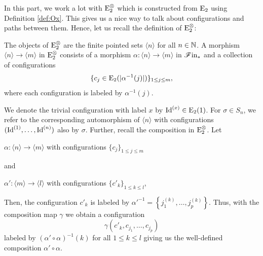 In this part,
we work a lot with $\operatorname{\operatorname{E}_2^{\otimes}}$ which is constructed from $\operatorname{E}_2$ using Definition \ref{def:Ox}. This gives us a nice way to talk about configurations and paths between
them. Hence, let us recall the definition of $\operatorname{\operatorname{E}_2^{\otimes}}$:
\begin{rem}\label{rem:ex}
    The objects of $\operatorname{\operatorname{E}_2^{\otimes}}$ are the finite pointed sets $\langle n \rangle$ for all
    $n \in \mathbb{N}$. A morphism $\langle n \rangle \to \langle m \rangle$ in $\operatorname{\operatorname{E}_2^{\otimes}}$
    consists of a morphism $\alpha \colon \langle n \rangle \to \langle m
    \rangle$ in $\mathscr{F} \text{in}_{\ast}$ and a collection of configurations
    $$\{c_j \in \operatorname{E}_2(|\alpha^{-1}(j)|)\}_{1 \leq j \leq m},$$ where each
    configuration is labeled by $\alpha^{-1}(j)$.

    We denote the trivial configuration with label $x$ by $\operatorname{Id}^{(x)} \in \operatorname{E}_2(1)$.
    For $\sigma \in S_n$, we refer to the corresponding automorphism of $\langle
    n \rangle$ with configurations $(\operatorname{Id}^{(1)}, \dots, \operatorname{Id}^{(n)})$ also by $\sigma$.
    Further, recall the composition in $\operatorname{\operatorname{E}_2^{\otimes}}$. Let 
    \begin{center}
        $\alpha \colon \langle n \rangle \to \langle m \rangle$ with
        configurations $\{c_j\}_{1 \leq j \leq m}$ 
    \end{center}
    and 
    \begin{center}
        $\alpha' \colon \langle m \rangle \to \langle l \rangle$ with
        configurations $\{c'_k\}_{1 \leq k \leq l}$,
    \end{center}
    Then, the configuration $c'_k$ is labeled by $\alpha'^{-1}=\left\{j_1^{(k)},
    \dots, j_p^{(k)}\right\}$. Thus, with the composition map $\gamma$ we obtain a configuration 
    \[
        \gamma(c'_k, c_{j_1}, \dots, c_{j_p})
    \]
    labeled by $(\alpha' \circ \alpha)^{-1}(k)$ for all $1 \leq k \leq l$ giving
    us the well-defined composition $\alpha' \circ \alpha$.
\end{rem}

